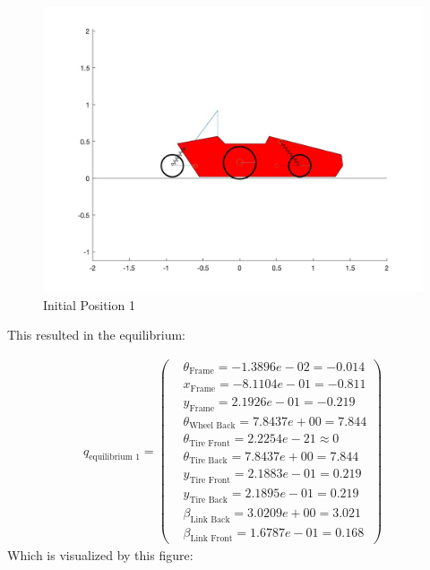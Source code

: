 \begin{figure}[ht]
    \centering
    \includegraphics[scale=0.235]{images/q_init_1.jpg}
    \caption{Initial Position 1}
    \label{fig:init_1}
\end{figure}


This resulted in the equilibrium:

\begin{equation}\label{eq:4.5.2}
    \begin{split}
        q_{\text{equilibrium 1}} = 
        \begin{pmatrix}
            &\theta_{\text{Frame}} = -1.3896e-02 = -0.014\\
            &x_{\text{Frame}} =  -8.1104e-01 = -0.811\\
            &y_{\text{Frame}} = 2.1926e-01 = -0.219\\
            &\theta_{\text{Wheel Back}} = 7.8437e+00 = 7.844\\
            &\theta_{\text{Tire Front}} = 2.2254e-21 \approx 0\\
            &\theta_{\text{Tire Back}} = 7.8437e+00 = 7.844\\
            &y_{\text{Tire Front}} = 2.1883e-01 = 0.219\\
            &y_{\text{Tire Back}} = 2.1895e-01 = 0.219\\
            &\beta_{\text{Link Back}} = 3.0209e+00 = 3.021\\
            &\beta_{\text{Link Front}} = 1.6787e-01 = 0.168
        \end{pmatrix}
    \end{split}
\end{equation}
Which is visualized by this figure:

